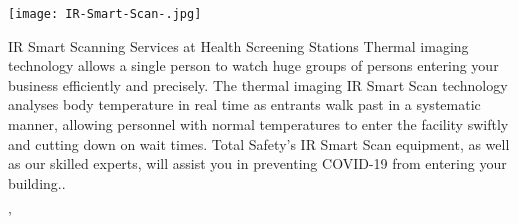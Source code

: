 \documentclass[12pt]{article}
\begin{document}
\begin{flushleft}
\texttt{[image: IR-Smart-Scan-.jpg]} 
\centering

IR Smart Scanning Services at Health Screening Stations Thermal imaging technology allows a single person to watch huge groups of persons entering your business efficiently and precisely. The thermal imaging IR Smart Scan technology analyses body temperature in real time as entrants walk past in a systematic manner, allowing personnel with normal temperatures to enter the facility swiftly and cutting down on wait times. Total Safety's IR Smart Scan equipment, as well as our skilled experts, will assist you in preventing COVID-19 from entering your building..



\end{flushleft}







'
\end{document}
